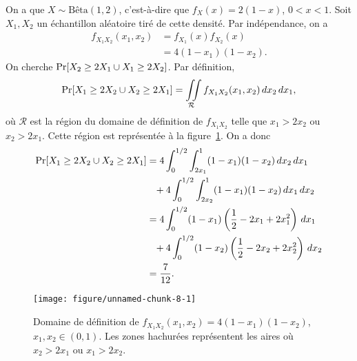 \begin{solution}{1.20}
    On a que $X \sim \text{Bêta}(1, 2)$, c'est-à-dire que $f_X(x) =
    2(1 - x)$, $0 < x < 1$. Soit $X_1, X_2$ un échantillon aléatoire
    tiré de cette densité. Par indépendance, on a
    \begin{align*}
      f_{X_1 X_2}(x_1, x_2)
      &= f_{X_1}(x) f_{X_2}(x) \\
      &= 4 (1 - x_1)(1 - x_2).
    \end{align*}
    On cherche $\mathrm{Pr} [ X_2 \geq 2X_1 \cup X_1 \geq 2X_2 ]$. Par
    définition,
    \begin{equation*}
      \mathrm{Pr} [ X_1 \geq 2X_2 \cup X_2 \geq 2X_1 ]
      = \iint\limits_{\mathcal{R}} f_{X_1 X_2}(x_1, x_2) \, dx_2\, dx_1,
    \end{equation*}
    où $\mathcal{R}$ est la région du domaine de définition de
    $f_{X_1X_2}$ telle que $x_1 > 2x_2$ ou $x_2 > 2x_1$. Cette région
    est représentée à la figure~\ref{fig:echantillon:domaine}. On a
    donc
    \begin{align*}
      \mathrm{Pr} [ X_1 \geq 2X_2 \cup X_2 \geq 2X_1 ]
      &= 4 \int_0^{1/2} \int_{2x_1}^1 (1 - x_1)(1 - x_2)\, dx_2\,dx_1 \\
      &\phantom{=}
      + 4 \int_0^{1/2} \int_{2x_2}^1 (1 - x_1)(1 - x_2)\, dx_1\,dx_2 \\
      &= 4 \int_0^{1/2} (1 - x_1)
      \left(
        \frac{1}{2} - 2x_1 + 2x_1^2
      \right)\, dx_1 \\
      &\phantom{=}
      + 4 \int_0^{1/2} (1 - x_2)
      \left(
        \frac{1}{2} - 2x_2 + 2x_2^2
      \right)\, dx_2 \\
      &= \frac{7}{12}.
    \end{align*}
    \begin{figure}
      \centering
\begin{knitrout}
\color{fgcolor}
\texttt{[image: figure/unnamed-chunk-8-1]}

\end{knitrout}
      \caption{Domaine de définition de $f_{X_1X_2}(x_1, x_2) =  4 (1
        - x_1)(1 - x_2)$, $x_1, x_2 \in (0, 1)$. Les zones hachurées
        représentent les aires où $x_2 > 2x_1$ ou $x_1 > 2x_2$.}
      \label{fig:echantillon:domaine}
      \end{figure}
  
\end{solution}

